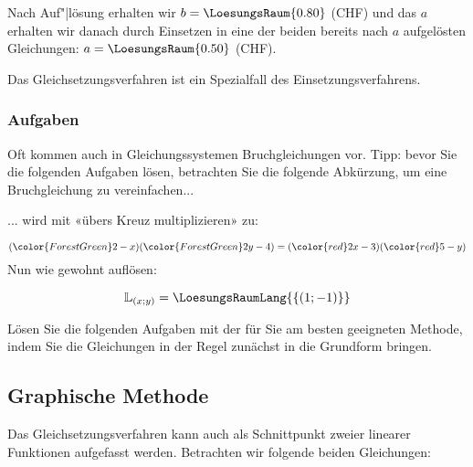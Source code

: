 
Nach Auf"|lösung erhalten wir $b=\LoesungsRaum{0.80}$ (CHF) und das $a$ erhalten wir danach durch Einsetzen in eine der beiden bereits nach $a$ aufgelösten Gleichungen: $a=\LoesungsRaum{0.50}$ (CHF).

Das Gleichsetzungsverfahren ist ein Spezialfall des
Einsetzungsverfahrens.
\newpage


\subsubsection*{Aufgaben}
Oft kommen auch in Gleichungssystemen Bruchgleichungen vor. Tipp:
bevor Sie die folgenden Aufgaben lösen, betrachten Sie die folgende
Abkürzung, um eine Bruchgleichung zu vereinfachen...

... wird mit «übers Kreuz multiplizieren» zu:

$$({\color{ForestGreen}2-x})({\color{ForestGreen}2y-4}) =
({\color{red}2x-3})({\color{red}5-y})$$
Nun wie gewohnt auflösen:

$$\mathbb{L}_{(x;y)} = \LoesungsRaumLang{\{(1; -1)\}}$$

Lösen Sie die folgenden Aufgaben mit der für Sie am besten geeigneten Methode, indem Sie die
Gleichungen in der Regel zunächst in die Grundform bringen.

\newpage


\subsection{Graphische Methode}
Das Gleichsetzungsverfahren kann auch als Schnittpunkt zweier linearer Funktionen
aufgefasst werden. Betrachten wir folgende beiden Gleichungen:

